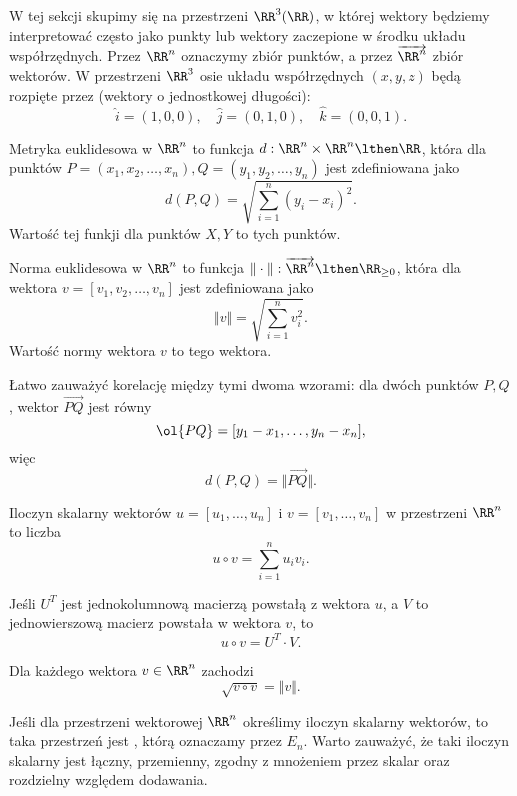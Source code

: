 W tej sekcji skupimy się na przestrzeni $\RR^3(\RR)$, w której wektory będziemy interpretować często jako punkty lub wektory zaczepione w środku układu współrzędnych. Przez $\RR^n$ oznaczymy zbiór punktów, a przez $\overrightarrow{\RR^n}$ zbiór wektorów. W przestrzeni $\RR^3$ osie  układu współrzędnych $(x, y, z)$ będą rozpięte przez  (wektory o jednostkowej długości):
\[ \hat{i} = (1, 0, 0), \quad \hat{j} = (0, 1, 0), \quad \hat{k} = (0, 0, 1). \]

\begin{definition}
    Metryka euklidesowa w $\RR^n$ to funkcja $d : \RR^n \times \RR^n \lthen \RR$, która dla punktów $P = (x_1, x_2, \ldots, x_n), Q = (y_1, y_2, \ldots, y_n)$ jest zdefiniowana jako
    \[ d(P, Q) = \sqrt{\sum_{i = 1}^n (y_i - x_i)^2}. \]
    Wartość tej funkji dla punktów $X, Y$ to  tych punktów.
\end{definition}

\begin{definition}
    Norma euklidesowa w $\RR^n$ to funkcja $\Vert\cdot\Vert : \overrightarrow{\RR^n} \lthen \RR_{\geq 0}$, która dla wektora $v = [v_1, v_2, \ldots, v_n]$ jest zdefiniowana jako
    \[ \Vert v\Vert = \sqrt{\sum_{i=1}^n v_i^2}. \]
    Wartość normy wektora $v$ to  tego wektora.
\end{definition}

Łatwo zauważyć korelację między tymi dwoma wzorami: dla dwóch punktów $P, Q$, wektor $\overrightarrow{PQ}$ jest równy
\[ \ol{PQ} = [y_1 - x_1, \ldots, y_n - x_n], \]
więc
\[ d(P, Q) = \Vert\overrightarrow{PQ}\Vert. \]

\begin{definition}
    Iloczyn skalarny wektorów $u = [u_1, \ldots, u_n]$ i $v = [v_1, \ldots, v_n]$ w przestrzeni $\RR^n$ to liczba
    \[ u \circ v = \sum_{i=1}^n u_iv_i. \]
\end{definition}

\begin{fact}
    Jeśli $U^T$ jest jednokolumnową macierzą powstałą z wektora $u$, a $V$ to jednowierszową macierz powstała w wektora $v$, to
    \[ u \circ v = U^T \cdot V. \]
\end{fact}

\begin{fact}
    Dla każdego wektora $v \in \RR^n$ zachodzi
    \[ \sqrt{v \circ v} = \Vert v \Vert. \]
\end{fact}

Jeśli dla przestrzeni wektorowej $\RR^n$ określimy iloczyn skalarny wektorów, to taka przestrzeń jest , którą oznaczamy przez $E_n$. Warto zauważyć, że taki iloczyn skalarny jest łączny, przemienny, zgodny z mnożeniem przez skalar oraz rozdzielny względem dodawania.

